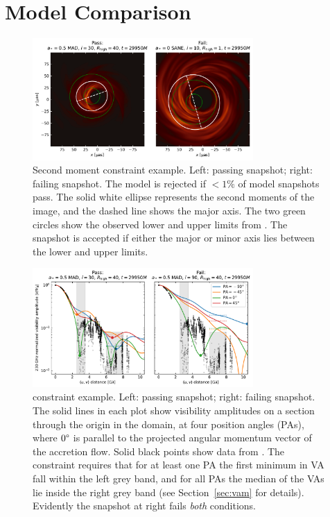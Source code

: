 \section{Model Comparison}\label{sec:comparisons}

\begin{figure}
  \centering
  \includegraphics[width=0.75\textwidth]{figures/passfail_sz.pdf}
  \caption{Second moment constraint example.
    Left: passing snapshot;
    right: failing snapshot.
    The model is rejected if $< 1\%$ of model snapshots pass.
    The solid white ellipse  represents the second moments of the image, and the dashed line shows the major axis.
    The two green circles show the observed lower and upper limits from .
    The snapshot is accepted if either the major or minor axis lies between the lower and upper limits.}
  \label{fig:passfail_sz}
\end{figure}

\begin{figure}
  \centering
  \includegraphics[width=0.75\textwidth]{figures/passfail_va.pdf}
  \caption{\vam constraint example.
    Left: passing snapshot; right: failing snapshot.
    The solid lines in each plot show visibility amplitudes on a section through the origin in the \uv domain, at four position angles (PAs), where $0\degree$ is parallel to the projected angular momentum vector of the accretion flow.
    Solid black points show data from \aprilvii.
    The \vam constraint requires that for at least one PA the first minimum in VA fall within the left grey band, and for all PAs the median of the VAs lie inside the right grey band (see Section~\ref{sec:vam} for details).
    Evidently the snapshot at right fails {\em both} conditions.}
  \label{fig:passfail_va}
\end{figure}

